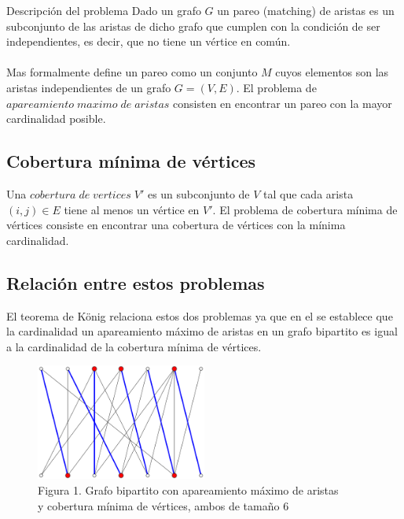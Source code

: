 \documentclass[12pt,a4paper]{article}
\begin{document}
\begin{section}{Descripción del problema} \noindent 
Dado un grafo $G$ un pareo (matching) de aristas es un subconjunto de las aristas de dicho grafo que cumplen con la condición de ser independientes, es decir, que no tiene un vértice en común\cite{le2014algorithms}.\\\\
Mas formalmente \cite{butenko2003maximum} define un pareo como un conjunto $M$ cuyos elementos son las aristas independientes de un grafo $G=(V,E)$. El problema de $apareamiento\; maximo\; de\; aristas$ consisten en encontrar un pareo con la mayor cardinalidad posible.
\subsection{Cobertura mínima de vértices} \noindent 
Una $cobertura\; de\; vertices\; V'$ es un subconjunto de $V$ tal que cada arista $(i,j) \in E$ tiene al menos un vértice en $V'$. El problema de cobertura mínima de vértices consiste en encontrar una cobertura de vértices con la mínima cardinalidad\cite{butenko2003maximum}.
\subsection{Relación entre estos problemas} \noindent 
El teorema de König relaciona estos dos problemas ya que en el se establece que la cardinalidad un apareamiento máximo de aristas en un grafo bipartito es igual a la cardinalidad de la cobertura mínima de vértices\cite{rizzi2000short}. 
\begin{center}
\begin{figure}[h]
\centering
\captionsetup{justification=centering}
\includegraphics[width=0.50\textwidth]{images/Konigs-theorem-graph.png}
\caption*{\footnotesize Figura 1. Grafo bipartito con apareamiento máximo de aristas \\y cobertura mínima de vértices, ambos de tamaño 6}
\end{figure}
\end{center}
\end{section}
\end{document}
